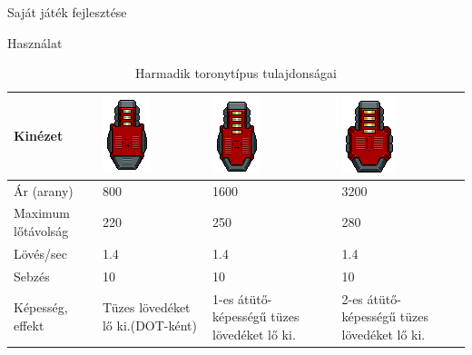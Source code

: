 \begin{MyChapter}{Saját játék fejlesztése}
\begin{MySection}{Használat}
		\begin{table}[H]
			\centering
			\caption{Harmadik toronytípus tulajdonságai}
			\label{tab:torony_tipus_2}
			\begin{tabular}{|L{3.75cm}|C{3.07cm}|C{3.06cm}|C{3.06cm}|}
				\hline
				Kinézet & \includegraphics[scale=0.63]{kepek/jatekHasznalat/torony_21} & \includegraphics[scale=0.63]{kepek/jatekHasznalat/torony_22} & \includegraphics[scale=0.63]{kepek/jatekHasznalat/torony_23} \\ \hline
				Ár (arany) & 800 & 1600 & 3200 \\ \hline
				Maximum lőtávolság & 220 & 250 & 280 \\ \hline
				Lövés/sec & 1.4 & 1.4 & 1.4 \\ \hline
				Sebzés & 10 & 10 & 10 \\ \hline
				Képesség, effekt & Tüzes lövedéket lő ki.(DOT-ként) & 1-es átütő- képességű tüzes lövedéket lő ki. & 2-es átütő- képességű tüzes lövedéket lő ki. \\ \hline
			\end{tabular}
		\end{table}
	
	

\end{MySection}
\end{MyChapter}
